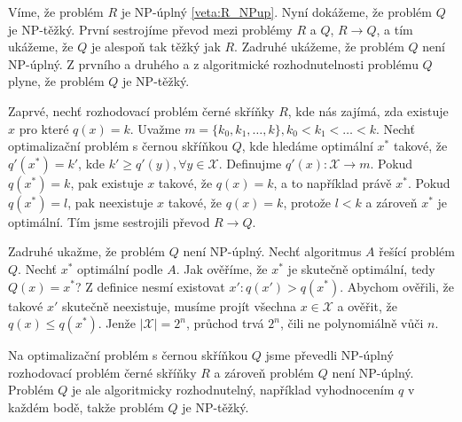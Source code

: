 \begin{dukaz}
  Víme, že problém $R$ je NP-úplný \ref{veta:R_NPup}. Nyní dokážeme, že problém $Q$ je NP-těžký.
  První sestrojíme převod mezi problémy $R$ a $Q$, $R \rightarrow Q$, a tím ukážeme, že $Q$ je alespoň tak těžký jak $R$.
  Zadruhé ukážeme, že problém $Q$ není NP-úplný.
  Z prvního a druhého a z algoritmické rozhodnutelnosti problému $Q$ plyne, že problém $Q$ je NP-těžký.

  Zaprvé, nechť rozhodovací problém černé skříňky $R$, kde nás zajímá, zda existuje $x$ pro které $q(x) = k$. 
  Uvažme $m = \{ k_0, k_1, \dots , k\}, k_0 < k_1 < \dots < k$.
  Nechť optimalizační problém s černou skříňkou $Q$, kde hledáme optimální $x^*$ takové, že $q'(x^*) = k'$, kde $k' \geq q'(y), \forall y \in \mathcal{X}$.
  Definujme $q'(x) \colon \mathcal{X} \rightarrow m$.
  Pokud $q(x^*) = k$, pak existuje $x$ takové, že $q(x) = k$, a to například právě $x^*$.
  Pokud $q(x^*) = l$, pak neexistuje $x$ takové, že $q(x) = k$, protože $l < k$ a zároveň $x^*$ je optimální.
  Tím jsme sestrojili převod $R \rightarrow Q$.

  Zadruhé ukažme, že problém $Q$ není NP-úplný.
  Nechť algoritmus $A$ řešící problém $Q$.
  Nechť $x^*$ optimální podle $A$. Jak ověříme, že $x^*$ je skutečně optimální, tedy $Q(x) = x^*$?
  Z definice nesmí existovat $x' \colon q(x') > q(x^*)$.
  Abychom ověřili, že takové $x'$ skutečně neexistuje, musíme projít všechna $x \in \mathcal{X}$ a ověřit, že $q(x) \leq q(x^*)$.
  Jenže $|\mathcal{X}| = 2^n$, průchod trvá $2^n$, čili ne polynomiálně vůči $n$.

  Na optimalizační problém s černou skříňkou $Q$ jsme převedli NP-úplný rozhodovací problém černé skříňky $R$ a zároveň
  problém $Q$ není NP-úplný. Problém $Q$ je ale algoritmicky rozhodnutelný, například vyhodnocením $q$ v každém bodě, takže problém $Q$ je NP-těžký.
\end{dukaz}

